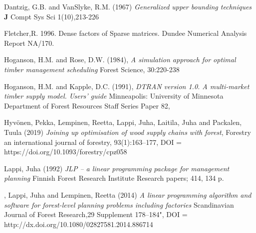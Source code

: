 \begin{thebibliography}{9}

Dantzig, G.B. and VanSlyke, R.M.  (1967)
\emph{Generalized upper bounding techniques}
\textbf{J} Compt Sys Sci 1(10),213-226

Fletcher,R.  1996. Dense factors of Sparse matrices. Dundee
Numerical Analysis Report NA/170.


Hoganson, H.M. and Rose, D.W.  (1984),
\emph{A simulation approach for optimal timber management scheduling}
Forest Science, 30:220-238

Hoganson, H.M. and Kapple,  D.C. (1991),
\emph{DTRAN version 1.0. A multi-market timber supply model. Users’ guide}
Minneapolis: University of Minnesota Department of Forest
Resources Staff Series Paper 82,

Hyv\"onen, Pekka, Lempinen, Reetta,
Lappi, Juha, Laitila, Juha  and Packalen, Tuula (2019)
\emph{Joining up optimisation of wood supply chains with forest},
Forestry an international journal of forestry,
93(1):163--177,
DOI = https://doi.org/10.1093/forestry/cpz058

 Lappi, Juha (1992) \emph{JLP -- a linear programming package for
management planning} Finnish Forest Research Institute
Research papers; 414, 134 p.



,
Lappi, Juha and Lempinen, Reetta (2014)
\emph{A linear programming algorithm and software
for forest-level planning problems
including factories}
Scandinavian Journal of Forest Research,29 Supplement 178--184",
DOI =  http://dx.doi.org/10.1080/02827581.2014.886714







\end{thebibliography}
